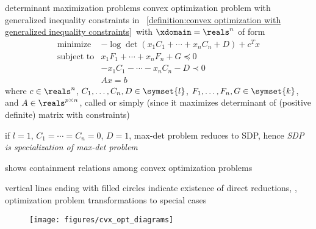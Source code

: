 \documentclass[17pt,landscape]{foils}
\begin{document}
{

\begin{mydefinition}{determinant maximization problems}
	convex optimization problem with generalized inequality constraints
	in ~\ref{definition:convex optimization with generalized inequality constraints}\
	with $\xdomain=\reals^n$
	of form
	$$
		\begin{array}{ll}
			\mbox{minimize} &
				-\log \det (x_1C_1 + \cdots + x_n C_n + D)
				+c^Tx
			\\
			\mbox{subject to} &
				x_1F_1 + \cdots + x_nF_n + G \preceq 0
			\\ &
				-x_1C_1 - \cdots - x_nC_n - D \prec 0
			\\ &
				Ax = b
		\end{array}
	$$
	where
	$c\in\reals^n$,
	$C_1,\ldots,C_n,D\in\symset{l}$,
	$F_1,\ldots,F_n,G\in\symset{k}$,
	and
	$A\in\reals^{p\times n}$,
	called 
	or simply 
	(since it maximizes determinant of (positive definite) matrix with constraints)
\end{mydefinition}

\bit
\item
	if $l=1$, $C_1=\cdots=C_n=0$, $D=1$,
	max-det problem reduces to SDP,
	hence \emph{SDP is specialization of max-det problem}
\eit



\bit
\item
	shows
	containment relations among convex optimization problems
\item
	vertical lines ending with filled circles indicate existence of direct reductions,
	\ie, optimization problem transformations to special cases
\eit

\begin{figure}
\begin{center}
	\texttt{[image: figures/cvx\_opt\_diagrams]}%
	\label{fig:diagrams for containment of convex optimization problems}
\end{center}
\end{figure}



}
\end{document}

